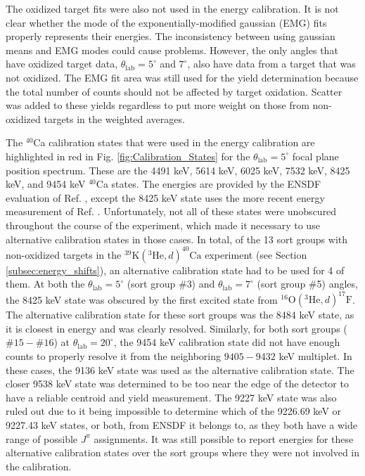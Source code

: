 The oxidized target fits were also not used in the energy calibration. It is not clear whether the mode of the exponentially-modified gaussian (EMG) fits properly represents their energies. The inconsistency between using gaussian means and EMG modes could cause problems. However, the only angles that have oxidized target data, $\theta_{\mathrm{lab}} = 5^{\circ}$ and $7^{\circ}$, also have data from a target that was not oxidized. The EMG fit area was still used for the yield determination because the total number of counts should not be affected by target oxidation. Scatter was added to these yields regardless to put more weight on those from non-oxidized targets in the weighted averages.

The $^{40}$Ca calibration states that were used in the energy calibration are highlighted in red in Fig. \ref{fig:Calibration_States} for the $\theta_{\mathrm{lab}} = 5^{\circ}$ focal plane position spectrum. These are the 4491 keV, 5614 keV, 6025 keV, 7532 keV, 8425 keV, and 9454 keV $^{40}$Ca states. The energies are provided by the ENSDF evaluation of Ref. \cite{Chen2017}, except the 8425 keV state uses the more recent energy measurement of Ref. \cite{Gribble2022}. Unfortunately, not all of these states were unobscured throughout the course of the experiment, which made it necessary to use alternative calibration states in those cases. In total, of the 13 sort groups with non-oxidized targets in the $^{39}\mathrm{K}(^{3}\mathrm{He},d)^{40}\mathrm{Ca}$ experiment (see Section \ref{subsec:energy_shifts}), an alternative calibration state had to be used for 4 of them. At both the $\theta_{\mathrm{lab}} = 5^{\circ}$ (sort group $\#$3) and $\theta_{\mathrm{lab}} = 7^{\circ}$ (sort group $\#$5) angles, the 8425 keV state was obscured by the first excited state from $^{16}\mathrm{O}(^{3}\mathrm{He},d)^{17}\mathrm{F}$. The alternative calibration state for these sort groups was the 8484 keV state, as it is closest in energy and was clearly resolved. Similarly, for both sort groups ($\#15-\#16$) at $\theta_{\mathrm{lab}} = 20^{\circ}$, the 9454 keV calibration state did not have enough counts to properly resolve it from the neighboring $9405-9432$ keV multiplet. In these cases, the 9136 keV state was used as the alternative calibration state. The closer 9538 keV state was determined to be too near the edge of the detector to have a reliable centroid and yield measurement. The 9227 keV state was also ruled out due to it being impossible to determine which of the 9226.69 keV or 9227.43 keV states, or both, from ENSDF it belongs to, as they both have a wide range of possible $J^{\pi}$ assignments. It was still possible to report energies for these alternative calibration states over the sort groups where they were not involved in the calibration.

